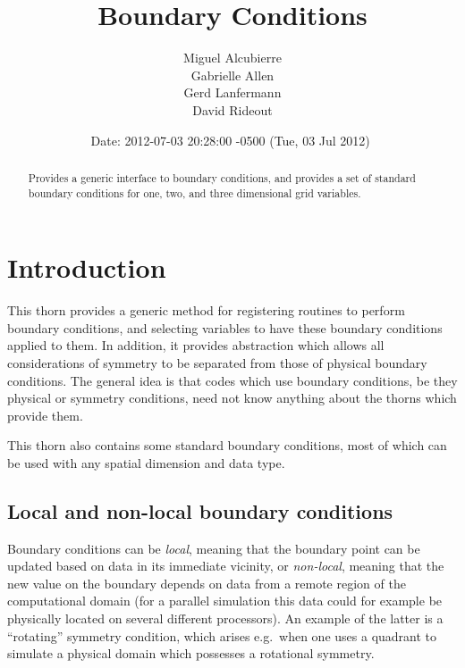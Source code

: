 \documentclass{article}
\begin{document}
\title{Boundary Conditions}
\author{Miguel Alcubierre \\ Gabrielle Allen \\ Gerd Lanfermann \\ David Rideout}
\date{$ $Date: 2012-07-03 20:28:00 -0500 (Tue, 03 Jul 2012) $ $}

\maketitle


\begin{abstract}
Provides a generic interface to boundary conditions, and provides a
set of standard boundary conditions for one, two, and three
dimensional grid variables.
\end{abstract}


\section{Introduction}

This thorn provides a generic method for registering routines to perform
boundary conditions, and selecting variables to have these boundary
conditions applied to them.  In addition, it provides abstraction
which allows all considerations of symmetry to be separated from
those of physical boundary conditions.
The general idea is that codes which use boundary conditions, be they
physical or symmetry conditions, need not know anything about the
thorns which provide them.

This thorn also contains some standard boundary conditions, most of which 
can be used with any spatial dimension and data type.

\subsection{Local and non-local boundary conditions}

Boundary conditions can be \emph{local}, meaning that the boundary
point can be updated based on data in its immediate vicinity, or
\emph{non-local}, meaning that the new value on the boundary depends
on data from a remote region of the computational domain (for a parallel 
simulation this data could for example be physically located on several different processors).  An example
of the latter is a ``rotating'' symmetry condition, which arises
e.g.~when one uses a quadrant to simulate a physical domain which
possesses a rotational symmetry.
\end{document}
